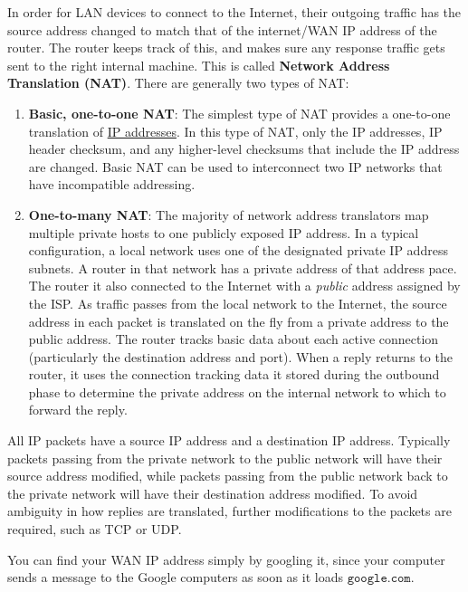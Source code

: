 \documentclass{article}
\newcounter{definition}[section]
\begin{document}
  \begin{definition}[NAT]
    \label{def:nat}
  In order for LAN devices to connect to the Internet, their outgoing traffic has the source address changed to match that of the internet/WAN IP address of the router. The router keeps track of this, and makes sure any response traffic gets sent to the right internal machine. This is called \textbf{Network Address Translation (NAT)}. There are generally two types of NAT: 
  \begin{enumerate}
      \item \textbf{Basic, one-to-one NAT}: The simplest type of NAT provides a one-to-one translation of \hyperref[def:ip-addresses]{IP addresses}. In this type of NAT, only the IP addresses, IP header checksum, and any higher-level checksums that include the IP address are changed. Basic NAT can be used to interconnect two IP networks that have incompatible addressing. 
      \item \textbf{One-to-many NAT}: The majority of network address translators map multiple private hosts to one publicly exposed IP address. In a typical configuration, a local network uses one of the designated private IP address subnets. A router in that network has a private address of that address pace. The router it also connected to the Internet with a \textit{public} address assigned by the ISP. As traffic passes from the local network to the Internet, the source address in each packet is translated on the fly from a private address to the public address. The router tracks basic data about each active connection (particularly the destination address and port). When a reply returns to the router, it uses the connection tracking data it stored during the outbound phase to determine the private address on the internal network to which to forward the reply. 
  \end{enumerate}
  All IP packets have a source IP address and a destination IP address. Typically packets passing from the private network to the public network will have their source address modified, while packets passing from the public network back to the private network will have their destination address modified. To avoid ambiguity in how replies are translated, further modifications to the packets are required, such as TCP or UDP. 
  \end{definition}

  You can find your WAN IP address simply by googling it, since your computer sends a message to the Google computers as soon as it loads $\texttt{google.com}$. 
\end{document}
